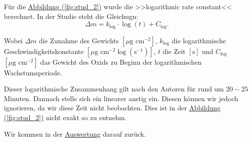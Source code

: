 Für die \hyperref[fig:stud_2]{Abbildung (\ref*{fig:stud_2})} wurde die >>logarithmic rate constant<< berechnet. In der Studie steht die Gleichugn:
\begin{equation}
    \Delta m = k_{\log} \cdot \log(t) + C_{\log}.
    \label{eq:stud_log}
\end{equation}

Wobei \(\Delta m \) die Zunahme des Gewichts \([\mu\text{g cm}^{-2}]\),  
\( k_{\log} \) die logarithmische Geschwindigkeitskonstante \([\mu\text{g cm}^{-2} \log(\text{s}^{-1})]\),  
\( t \) die Zeit \([\text{s}]\) und  
\( C_{\log} \) \([\mu\text{g cm}^{-2}]\) das Gewicht des Oxids zu Beginn der logarithmischen Wachstumsperiode.

Dieser logarithmische Zusammenhang gilt nach den Autoren für rund um $20-25$ Minuten. Dannach stelle sich ein linearer anstig ein. Diesen können wir jedoch ignorieren, da wir diese Zeit nicht beobachten.
Dies ist in der \hyperref[fig:stud_2]{Abbildung (\ref*{fig:stud_2})} nicht exakt so zu entnehm.

Wir kommen in der \hyperref[ch:auswertung]{Auswertung} darauf zurück.